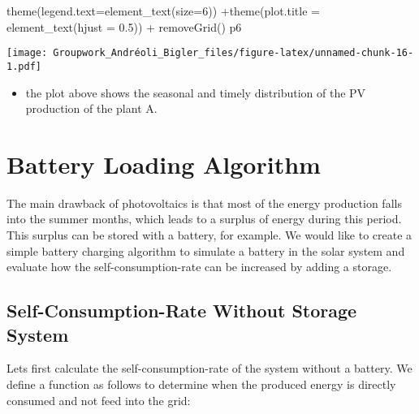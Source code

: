 \documentclass[
]{article}
\newenvironment{Shaded}{\begin{snugshade}}{\end{snugshade}}
\newcommand{\AttributeTok}[1]{\textcolor[rgb]{0.77,0.63,0.00}{#1}}
\newcommand{\DecValTok}[1]{\textcolor[rgb]{0.00,0.00,0.81}{#1}}
\newcommand{\FloatTok}[1]{\textcolor[rgb]{0.00,0.00,0.81}{#1}}
\newcommand{\FunctionTok}[1]{\textcolor[rgb]{0.00,0.00,0.00}{#1}}
\newcommand{\NormalTok}[1]{#1}
\newcommand{\SpecialCharTok}[1]{\textcolor[rgb]{0.00,0.00,0.00}{#1}}
\providecommand{\tightlist}{%
  \setlength{\itemsep}{0pt}\setlength{\parskip}{0pt}}
\begin{document}
\begin{Shaded}
\begin{Highlighting}[]
  \FunctionTok{theme}\NormalTok{(}\AttributeTok{legend.text=}\FunctionTok{element\_text}\NormalTok{(}\AttributeTok{size=}\DecValTok{6}\NormalTok{)) }\SpecialCharTok{+}\FunctionTok{theme}\NormalTok{(}\AttributeTok{plot.title =} \FunctionTok{element\_text}\NormalTok{(}\AttributeTok{hjust =} \FloatTok{0.5}\NormalTok{)) }\SpecialCharTok{+}
  \FunctionTok{removeGrid}\NormalTok{()}
\NormalTok{p6}
\end{Highlighting}
\end{Shaded}

\texttt{[image: Groupwork\_Andréoli\_Bigler\_files/figure-latex/unnamed-chunk-16-1.pdf]}

\begin{itemize}
\tightlist
\item
  the plot above shows the seasonal and timely distribution of the PV
  production of the plant A.
\end{itemize}

\newpage

\hypertarget{battery-loading-algorithm}{%
\section{Battery Loading Algorithm}\label{battery-loading-algorithm}}

The main drawback of photovoltaics is that most of the energy production
falls into the summer months, which leads to a surplus of energy during
this period. This surplus can be stored with a battery, for example. We
would like to create a simple battery charging algorithm to simulate a
battery in the solar system and evaluate how the self-consumption-rate
can be increased by adding a storage.

\hypertarget{self-consumption-rate-without-storage-system}{%
\subsection{Self-Consumption-Rate Without Storage
System}\label{self-consumption-rate-without-storage-system}}

Lets first calculate the self-consumption-rate of the system without a
battery. We define a function as follows to determine when the produced
energy is directly consumed and not feed into the grid:
\end{document}
